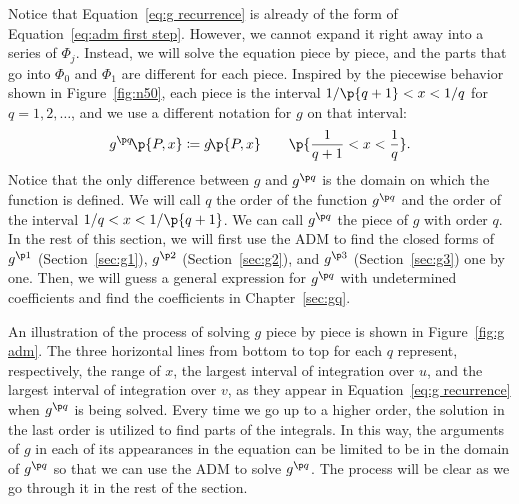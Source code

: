 \documentclass[oneside,12pt,final]{ucthesis-CA2012}
\newcommand{\ceq}{\coloneqq}
\newcommand{\fr}{\frac}
\newcommand{\fc}[2]{#1\mathchoice{\!}{\!}{}{}\p{#2}} %
\begin{document}
\begin{mainmatter}
Notice that Equation~\ref{eq:g recurrence} is already of the form of Equation~\ref{eq:adm first step}.
However, we cannot expand it right away into a series of $\Phi_j$.
Instead, we will solve the equation piece by piece,
and the parts that go into $\Phi_0$ and $\Phi_1$ are different for each piece.
Inspired by the piecewise behavior shown in Figure~\ref{fig:n50},
each piece is the interval $1/\p{q+1}<x<1/q$ for $q=1,2,\ldots$,
and we use a different notation for $g$ on that interval:
\[\fc{g^{\p q}}{P,x}\ceq\fc g{P,x}\qquad\p{\fr1{q+1}<x<\fr1q}.\]
Notice that the only difference between $g$ and $g^{\p q}$ is the domain on which the function is defined.
We will call $q$ the order of the function $g^{\p q}$ and the order of the interval $1/q<x<1/\p{q+1}$.
We can call $g^{\p q}$ the piece of $g$ with order $q$.
In the rest of this section, we will first use the ADM to find
the closed forms of $g^{\p1}$ (Section~\ref{sec:g1}), $g^{\p2}$ (Section~\ref{sec:g2}),
and $g^{\p3}$ (Section~\ref{sec:g3}) one by one.
Then, we will guess a general expression for $g^{\p q}$ with undetermined coefficients and find the coefficients
in Chapter~\ref{sec:gq}.

An illustration of the process of solving $g$ piece by piece is shown in Figure~\ref{fig:g adm}.
The three horizontal lines from bottom to top for each $q$
represent, respectively,
the range of $x$, the largest interval of integration over $u$,
and the largest interval of integration over $v$,
as they appear in Equation~\ref{eq:g recurrence} when $g^{\p q}$ is being solved.
Every time we go up to a higher order,
the solution in the last order is utilized to find parts of the integrals.
In this way, the arguments of $g$ in each of its appearances in the equation
can be limited to be in the domain of $g^{\p q}$
so that we can use the ADM to solve $g^{\p q}$.
The process will be clear as we go through it in the rest of the section.


\end{mainmatter}
\end{document}

